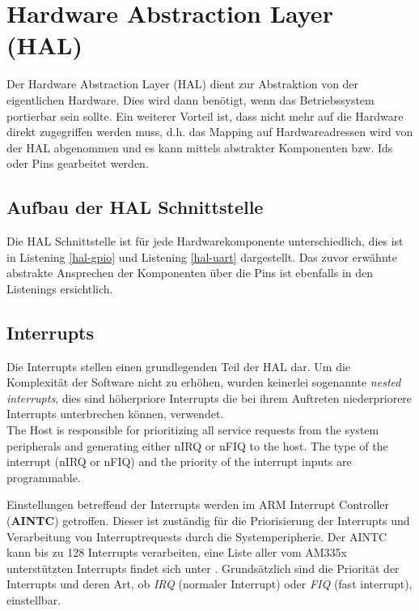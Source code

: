 \section{Hardware Abstraction Layer (HAL)}
\label{chapHAL}
Der Hardware Abstraction Layer (HAL) dient zur Abstraktion von der eigentlichen Hardware. Dies wird dann benötigt, wenn das Betriebssystem portierbar sein sollte. Ein weiterer Vorteil ist, dass nicht mehr auf die Hardware direkt zugegriffen werden muss, d.h. das Mapping auf Hardwareadressen wird von der HAL abgenommen und es kann mittels abstrakter Komponenten bzw. Ids oder Pins gearbeitet werden. 

\subsection{Aufbau der HAL Schnittstelle}
Die HAL Schnittstelle ist für jede Hardwarekomponente unterschiedlich, dies ist in Listening \ref{hal-gpio} und Listening \ref{hal-uart} dargestellt. Das zuvor erwähnte abstrakte Ansprechen der Komponenten über die Pins ist ebenfalls in den Listenings ersichtlich.





\subsection{Interrupts}

Die Interrupts stellen einen grundlegenden Teil der HAL dar. Um die Komplexität der Software nicht zu erhöhen, wurden keinerlei sogenannte \emph{nested interrupts}, dies sind höherpriore Interrupts die bei ihrem Auftreten niederpriorere Interrupts unterbrechen können, verwendet.\\


The Host is responsible for prioritizing all service requests from the
system peripherals and generating either nIRQ or nFIQ to the host. The type of the interrupt (nIRQ or
nFIQ) and the priority of the interrupt inputs are programmable.

Einstellungen betreffend der Interrupts werden im ARM Interrupt Controller (\textbf{AINTC}) getroffen. Dieser ist zuständig für die Priorisierung der Interrupts und Verarbeitung von Interruptrequests durch die Systemperipherie. Der AINTC kann bis zu 128 Interrupts verarbeiten, eine Liste aller vom AM335x unterstützten Interrupts findet sich unter \cite[S. 199]{ARM:TRM}. Grundsätzlich sind die Priorität der Interrupts und deren Art, ob \emph{IRQ} (normaler Interrupt) oder \emph{FIQ} (fast interrupt), einstellbar.\\ 


